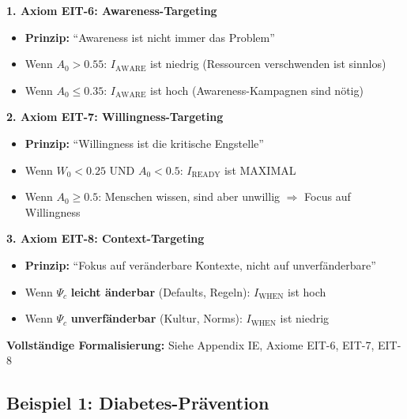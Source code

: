 \begin{tcolorbox}[colback=green!5!white, colframe=green!75!black,
    title=\textbf{Die drei Kernfunktionen der Intervention-Emergenz}]

\textbf{1. Axiom EIT-6: Awareness-Targeting}
\begin{itemize}[nosep]
\item \textbf{Prinzip:} ``Awareness ist nicht immer das Problem''
\item Wenn $A_0 > 0.55$: $I_{\text{AWARE}}$ ist niedrig (Ressourcen verschwenden ist sinnlos)
\item Wenn $A_0 \leq 0.35$: $I_{\text{AWARE}}$ ist hoch (Awareness-Kampagnen sind n\"{o}tig)
\end{itemize}

\textbf{2. Axiom EIT-7: Willingness-Targeting}
\begin{itemize}[nosep]
\item \textbf{Prinzip:} ``Willingness ist die kritische Engstelle''
\item Wenn $W_0 < 0.25$ UND $A_0 < 0.5$: $I_{\text{READY}}$ ist MAXIMAL
\item Wenn $A_0 \geq 0.5$: Menschen wissen, sind aber unwillig $\Rightarrow$ Focus auf Willingness
\end{itemize}

\textbf{3. Axiom EIT-8: Context-Targeting}
\begin{itemize}[nosep]
\item \textbf{Prinzip:} ``Fokus auf ver\"{a}nderbare Kontexte, nicht auf unverf\"{a}nderbare''
\item Wenn $\Psi_c$ \textbf{leicht \"{a}nderbar} (Defaults, Regeln): $I_{\text{WHEN}}$ ist hoch
\item Wenn $\Psi_c$ \textbf{unverf\"{a}nderbar} (Kultur, Norms): $I_{\text{WHEN}}$ ist niedrig
\end{itemize}

\vspace{0.3cm}
\textbf{Vollständige Formalisierung:} Siehe Appendix IE, Axiome EIT-6, EIT-7, EIT-8

\end{tcolorbox}

\subsection{Beispiel 1: Diabetes-Pr\"{a}vention}
\label{sec:17-example-diabetes}

